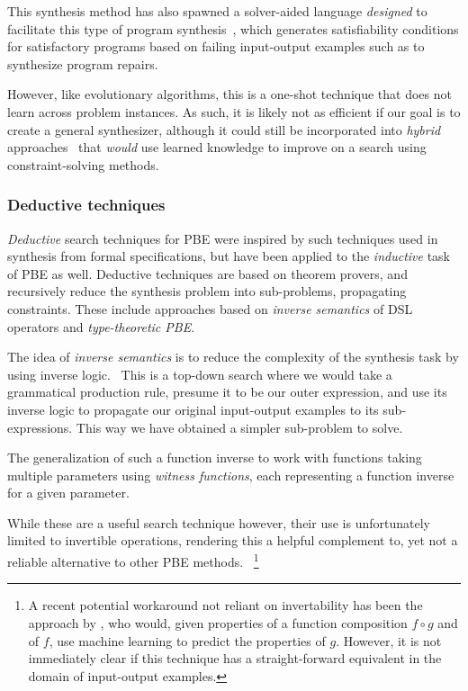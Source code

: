 \documentclass{article}
\begin{document}
This synthesis method has also spawned a solver-aided language
\emph{designed} to facilitate this type of program synthesis~\citep{rosette},
which generates satisfiability conditions for satisfactory programs
based on failing input-output examples such as to synthesize program repairs.

However, like evolutionary algorithms, this is a one-shot technique
that does not learn across problem instances.
As such, it is likely not as efficient if our goal is to create a general synthesizer,
although it could still be incorporated into \emph{hybrid} approaches~\citep{deepcoder} that \emph{would} use learned knowledge to improve on a search using constraint-solving methods.

\subsubsection{Deductive techniques}

\emph{Deductive} search techniques for PBE were inspired by such
techniques used in synthesis from formal specifications,
but have been applied to the \emph{inductive} task of PBE as well.
Deductive techniques are based on theorem provers,
and recursively reduce the synthesis problem into sub-problems,
propagating constraints.
These include approaches based on \emph{inverse semantics} of
DSL operators and \emph{type-theoretic PBE}.


The idea of \emph{inverse semantics} is to reduce the complexity
of the synthesis task by using inverse logic.~\citep{flashmeta,prose}
This is a top-down search where we would take a grammatical
production rule, presume it to be our outer expression,
and use its inverse logic to propagate our original
input-output examples to its sub-expressions.
This way we have obtained a simpler sub-problem to solve.

The generalization of such a function inverse to work with functions
taking multiple parameters using \emph{witness functions},
each representing a function inverse for a given parameter.

While these are a useful search technique however, their
use is unfortunately limited to invertible operations,
rendering this a helpful complement to, yet not a
reliable alternative to other PBE methods.%
~\footnote{
    A recent potential workaround not reliant on invertability
    has been the approach by \citet{odena2020learning},
    who would, given properties of a function composition
    $f \circ g$ and of $f$, use machine learning to predict
    the properties of $g$.
    However, it is not immediately clear if this technique
    has a straight-forward equivalent in the domain of
    input-output examples.
}
\end{document}
